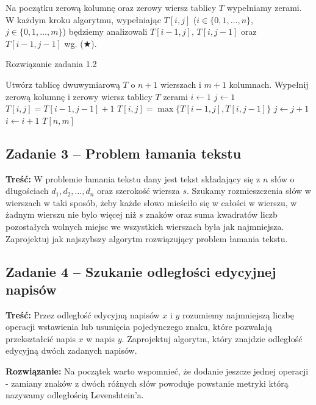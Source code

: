 Na początku zerową kolumnę oraz zerowy wiersz tablicy $T$
wypełniamy zerami. W każdym kroku algorytmu, wypełniając $T[i, j]$
($i \in \{0,1, \dots, n\}$, $j \in \{0,1, \dots, m\}$)
będziemy analizowali $T[i-1, j]$, $T[i, j-1]$ oraz $T[i-1,j-1]$ wg. ($\bigstar$).


\begin{algorithm}[H]
	\caption{Rozwiązanie zadania 1.2}\label{Zadanie12}
	\begin{algorithmic}[1]
		\State Utwórz tablicę dwuwymiarową $T$ o $n+1$ wierszach i $m+1$ kolumnach.
		\State Wypełnij zerową kolumnę i zerowy wiersz tablicy $T$ zerami
		\State $i \gets 1$
		\State $j \gets 1$
		\State $T[i, j] = T[i-1,j-1] + 1$
		\Else
		\State $T[i, j] = \max\{T[i-1,j], T[i,j-1]\}$
		\EndIf
		\State $j \gets j + 1$
		\EndWhile
		\State $i \gets i + 1$
		\EndWhile
		\State \Return $T[n, m]$
		\EndProcedure 
	\end{algorithmic}
\end{algorithm}


\subsection{Zadanie 3 -- Problem łamania tekstu}
\textbf{Treść:} W problemie łamania tekstu dany jest tekst składający się z $n$
słów o długościach $d_1, d_2, \ldots , d_n$ oraz
szerokość wiersza $s$. Szukamy rozmieszczenia słów w wierszach w taki 
sposób, żeby każde słowo mieściło się w całości
w wierszu, w żadnym wierszu nie bylo więcej niż $s$ znaków 
oraz suma kwadratów liczb pozostałych wolnych miejsc we
wszystkich wierszach była jak najmniejsza.
Zaprojektuj jak najszybszy algorytm rozwiązujący problem łamania tekstu.
\subsection{Zadanie 4 -- Szukanie odległości edycyjnej napisów}
\textbf{Treść:} Przez odległość edycyjną napisów 
$x$ i $y$ rozumiemy najmniejszą liczbę operacji wstawienia lub usunięcia
pojedynczego znaku, które pozwalają przekształcić napis $x$ w napis $y$.
Zaprojektuj algorytm, który znajdzie odległość 
edycyjną dwóch zadanych napisów.

\textbf{Rozwiązanie:}
Na początek warto wspomnieć, że dodanie jeszcze jednej operacji - 
zamiany znaków z dwóch różnych słów powoduje powstanie metryki
którą nazywamy odległością Levenshtein'a.

